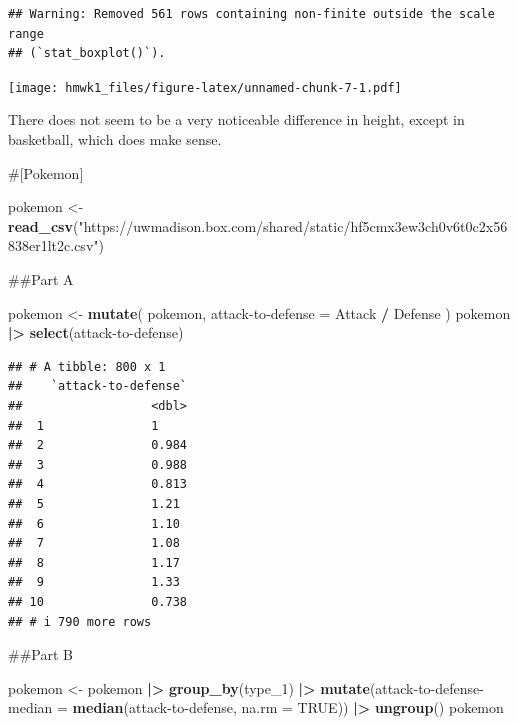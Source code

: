 \documentclass[
]{article}
\newenvironment{Shaded}{\begin{snugshade}}{\end{snugshade}}
\newcommand{\AttributeTok}[1]{\textcolor[rgb]{0.13,0.29,0.53}{#1}}
\newcommand{\ConstantTok}[1]{\textcolor[rgb]{0.56,0.35,0.01}{#1}}
\newcommand{\FunctionTok}[1]{\textcolor[rgb]{0.13,0.29,0.53}{\textbf{#1}}}
\newcommand{\NormalTok}[1]{#1}
\newcommand{\OtherTok}[1]{\textcolor[rgb]{0.56,0.35,0.01}{#1}}
\newcommand{\SpecialCharTok}[1]{\textcolor[rgb]{0.81,0.36,0.00}{\textbf{#1}}}
\newcommand{\StringTok}[1]{\textcolor[rgb]{0.31,0.60,0.02}{#1}}
\begin{document}
\begin{verbatim}
## Warning: Removed 561 rows containing non-finite outside the scale range
## (`stat_boxplot()`).
\end{verbatim}

\texttt{[image: hmwk1\_files/figure-latex/unnamed-chunk-7-1.pdf]}

There does not seem to be a very noticeable difference in height, except
in basketball, which does make sense.

\#{[}Pokemon{]}

\begin{Shaded}
\begin{Highlighting}[]
\NormalTok{pokemon }\OtherTok{\textless{}{-}} \FunctionTok{read\_csv}\NormalTok{(}\StringTok{"https://uwmadison.box.com/shared/static/hf5cmx3ew3ch0v6t0c2x56838er1lt2c.csv"}\NormalTok{)}
\end{Highlighting}
\end{Shaded}

\#\#Part A

\begin{Shaded}
\begin{Highlighting}[]
\NormalTok{pokemon }\OtherTok{\textless{}{-}} \FunctionTok{mutate}\NormalTok{(}
\NormalTok{  pokemon,}
  \StringTok{\textquotesingle{}attack{-}to{-}defense\textquotesingle{}} \OtherTok{=}\NormalTok{ Attack }\SpecialCharTok{/}\NormalTok{ Defense}
\NormalTok{)}
\NormalTok{pokemon }\SpecialCharTok{|\textgreater{}} \FunctionTok{select}\NormalTok{(}\StringTok{\textquotesingle{}attack{-}to{-}defense\textquotesingle{}}\NormalTok{)}
\end{Highlighting}
\end{Shaded}

\begin{verbatim}
## # A tibble: 800 x 1
##    `attack-to-defense`
##                  <dbl>
##  1               1    
##  2               0.984
##  3               0.988
##  4               0.813
##  5               1.21 
##  6               1.10 
##  7               1.08 
##  8               1.17 
##  9               1.33 
## 10               0.738
## # i 790 more rows
\end{verbatim}

\#\#Part B

\begin{Shaded}
\begin{Highlighting}[]
\NormalTok{pokemon }\OtherTok{\textless{}{-}}\NormalTok{ pokemon }\SpecialCharTok{|\textgreater{}}
  \FunctionTok{group\_by}\NormalTok{(type\_1) }\SpecialCharTok{|\textgreater{}}
  \FunctionTok{mutate}\NormalTok{(}\StringTok{\textasciigrave{}}\AttributeTok{attack{-}to{-}defense{-}median}\StringTok{\textasciigrave{}} \OtherTok{=} \FunctionTok{median}\NormalTok{(}\StringTok{\textasciigrave{}}\AttributeTok{attack{-}to{-}defense}\StringTok{\textasciigrave{}}\NormalTok{, }\AttributeTok{na.rm =} \ConstantTok{TRUE}\NormalTok{)) }\SpecialCharTok{|\textgreater{}}
  \FunctionTok{ungroup}\NormalTok{()}
\NormalTok{pokemon}
\end{Highlighting}
\end{Shaded}
\end{document}

